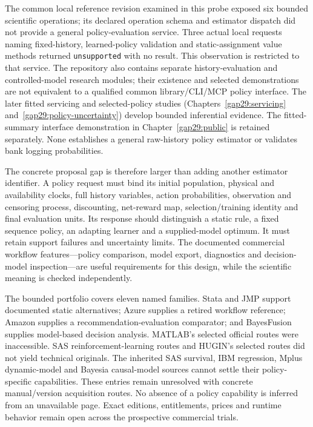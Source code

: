 The common local reference revision examined in this probe exposed six
bounded scientific operations; its declared operation schema and estimator
dispatch did not provide a general policy-evaluation service. Three actual local requests naming fixed-history,
learned-policy validation and static-assignment value methods returned
\texttt{unsupported} with no result. This observation is restricted to that
service. The repository also contains separate history-evaluation and
controlled-model research modules; their existence and selected demonstrations
are not equivalent to a qualified common library/CLI/MCP policy interface.
The later fitted servicing and selected-policy studies
(Chapters~\ref{gap29:servicing} and~\ref{gap29:policy-uncertainty}) develop
bounded inferential evidence. The fitted-summary interface demonstration in
Chapter~\ref{gap29:public} is retained separately. None establishes a general
raw-history policy estimator or validates bank logging probabilities.
\citep{exec16_cp_runtime}

The concrete proposal gap is therefore larger than adding another estimator
identifier. A policy request must bind its initial population, physical and
availability clocks, full history variables, action probabilities, observation
and censoring process, discounting, net-reward map, selection/training identity
and final evaluation units. Its response should distinguish a static rule,
a fixed sequence policy, an adapting learner and a supplied-model optimum.
It must retain support failures and uncertainty limits. The documented
commercial workflow features---policy comparison, model export, diagnostics
and decision-model inspection---are useful requirements for this design, while
the scientific meaning is checked independently. \citep{exec16_cp_matrix}

The bounded portfolio covers eleven named families. Stata and JMP support
documented static alternatives; Azure supplies a retired workflow reference;
Amazon supplies a recommendation-evaluation comparator; and BayesFusion
supplies model-based decision analysis. MATLAB's selected official routes were
inaccessible. SAS reinforcement-learning routes and HUGIN's selected routes
did not yield technical originals. The inherited SAS survival, IBM regression,
Mplus dynamic-model and Bayesia causal-model sources cannot settle their
policy-specific capabilities. These entries remain unresolved with concrete
manual/version acquisition routes. No absence of a policy capability is
inferred from an unavailable page. Exact editions, entitlements, prices and
runtime behavior remain open across the prospective commercial trials.
\citep{exec16_cp_matrix}

